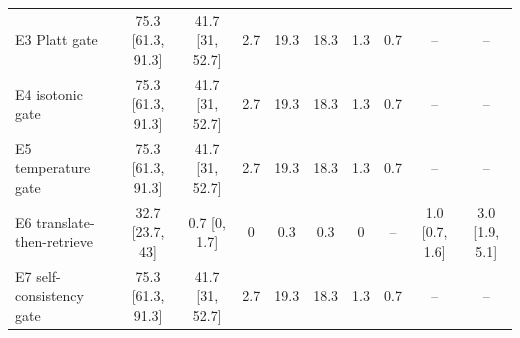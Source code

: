 \begin{table}[t]
\begin{tabular}{lccccccccc}
    E3 Platt gate & 75.3 [61.3, 91.3] & 41.7 [31, 52.7] & 2.7 & 19.3 & 18.3 & 1.3 & 0.7 & -- & -- \\
    E4 isotonic gate & 75.3 [61.3, 91.3] & 41.7 [31, 52.7] & 2.7 & 19.3 & 18.3 & 1.3 & 0.7 & -- & -- \\
    E5 temperature gate & 75.3 [61.3, 91.3] & 41.7 [31, 52.7] & 2.7 & 19.3 & 18.3 & 1.3 & 0.7 & -- & -- \\
    E6 translate-then-retrieve & 32.7 [23.7, 43] & 0.7 [0, 1.7] & 0 & 0.3 & 0.3 & 0 & -- & 1.0 [0.7, 1.6] & 3.0 [1.9, 5.1] \\
    E7 self-consistency gate & 75.3 [61.3, 91.3] & 41.7 [31, 52.7] & 2.7 & 19.3 & 18.3 & 1.3 & 0.7 & -- & -- \\
    \bottomrule
  \end{tabular}
\end{table}
